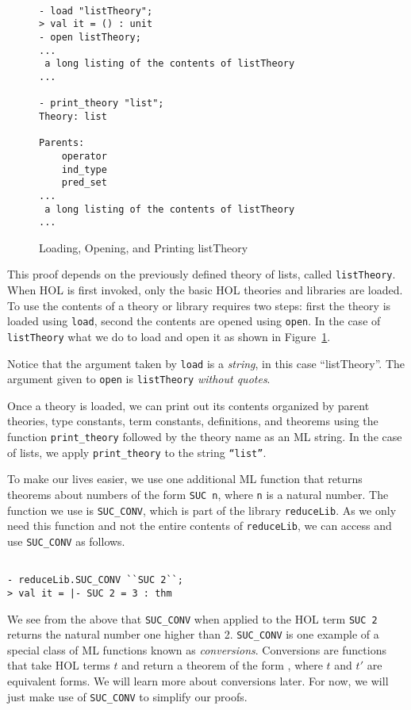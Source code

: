 \begin{figure}[t]
  \centering
  \begin{session}
\begin{verbatim}

- load "listTheory";
> val it = () : unit
- open listTheory;
...
 a long listing of the contents of listTheory
...

- print_theory "list";
Theory: list

Parents:
    operator
    ind_type
    pred_set
...
 a long listing of the contents of listTheory
...
\end{verbatim}
  \end{session}
  \caption{Loading, Opening, and Printing listTheory}
\label{fig:list-theory}
\end{figure}

This proof depends on the previously defined theory of lists, called
\texttt{listTheory}. When HOL is first invoked, only the basic HOL
theories and libraries are loaded.  To use the contents of a theory or
library requires two steps: first the theory is loaded using
\texttt{load}, second the contents are opened using \texttt{open}.  In
the case of \texttt{listTheory} what we do to load and open it as
shown in Figure~\ref{fig:list-theory}.

Notice that the argument taken by \texttt{load} is a \emph{string}, in
this case ``listTheory''.  The argument given to \texttt{open} is
\texttt{listTheory} \emph{without quotes}.  

Once a theory is loaded, we can print out its contents organized by
parent theories, type constants, term constants, definitions, and
theorems using the function \texttt{print\_theory} followed by the
theory name as an ML string.  In the case of lists, we apply
\texttt{print\_theory} to the string \texttt{``list''}.

To make our lives easier, we use one additional ML function that
returns theorems about numbers of the form \texttt{SUC n}, where
\texttt{n} is a natural number. The function we use is
\texttt{SUC\_CONV}, which is part of the library \texttt{reduceLib}.
As we only need this function and not the entire contents of
\texttt{reduceLib}, we can access and use \texttt{SUC\_CONV} as
follows.
\begin{session}
\begin{verbatim}

- reduceLib.SUC_CONV ``SUC 2``;
> val it = |- SUC 2 = 3 : thm
\end{verbatim}
\end{session}
We see from the above that \texttt{SUC\_CONV} when applied to the HOL
term \texttt{SUC 2} returns the natural number one higher than
2. \texttt{SUC\_CONV} is one example of a special class of ML
functions known as \emph{conversions}.  Conversions are functions that
take HOL terms $t$ and return a theorem of the form , where
$t$ and $t'$ are equivalent forms.  We will learn more about
conversions later. For now, we will just make use of
\texttt{SUC\_CONV} to simplify our proofs.

